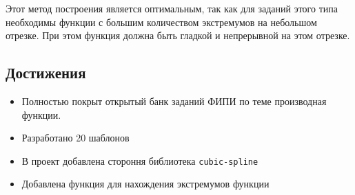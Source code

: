 \documentclass[a4paper, 12pt]{extarticle}
\begin{document}
Этот метод построения является оптимальным, так как для заданий этого типа необходимы функции с большим количеством экстремумов на небольшом отрезке. При этом функция должна быть гладкой и непрерывной на этом отрезке.  

\subsection*{Достижения}
\begin{itemize}
    \item Полностью покрыт открытый банк заданий ФИПИ по теме производная функции.
    \item Разработано 20 шаблонов
    \item В проект добавлена стороння библиотека \texttt{cubic-spline}
    \item Добавлена функция для нахождения экстремумов функции
\end{itemize}
\end{document}
